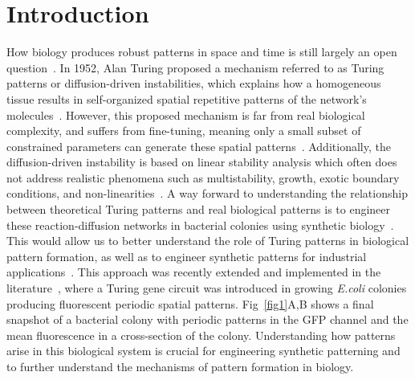 \documentclass[10pt,letterpaper]{article}
\begin{document}
\linenumbers

\section*{Introduction}

How biology produces robust patterns in space and time is still largely an open question~\cite{scholes2017three}.
In 1952, Alan Turing proposed a mechanism referred to as Turing patterns or diffusion-driven instabilities, which explains how a homogeneous tissue results in self-organized spatial repetitive patterns of the network’s molecules~\cite{Turing1952, Gierer1972}.
However, this proposed mechanism is far from real biological complexity, and suffers from fine-tuning, meaning only a small subset of constrained parameters can generate these spatial patterns~\cite{maini2012turing, Scholes2019}.
Additionally, the diffusion-driven instability is based on linear stability analysis which often does not address realistic phenomena such as multistability, growth, exotic boundary conditions, and non-linearities~\cite{Krause2023}.
A way forward to understanding the relationship between theoretical Turing patterns and real biological patterns is to engineer these reaction-diffusion networks in bacterial colonies using synthetic biology~\cite{Sekine2018, Karig2018}.
This would allow us to better understand the role of Turing patterns in biological pattern formation, as well as to engineer synthetic patterns for industrial applications~\cite{cao2017programmable, tan2018polyamide,din2020interfacing}.
This approach was recently extended and implemented in the literature~\cite{Oliver2023}, where a Turing gene circuit was introduced in growing \textit{E.coli} colonies producing fluorescent periodic spatial patterns. Fig~\ref{fig1}A,B shows a final snapshot of a bacterial colony with periodic patterns in the GFP channel and the mean fluorescence in a cross-section of the colony.
Understanding how patterns arise in this biological system is crucial for engineering synthetic patterning and to further understand the mechanisms of pattern formation in biology.
\end{document}
